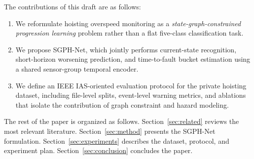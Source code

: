 The contributions of this draft are as follows:
\begin{enumerate}
\item We reformulate hoisting overspeed monitoring as a \emph{state-graph-constrained progression learning} problem rather than a flat five-class classification task.
\item We propose SGPH-Net, which jointly performs current-state recognition, short-horizon worsening prediction, and time-to-fault bucket estimation using a shared sensor-group temporal encoder.
\item We define an IEEE IAS-oriented evaluation protocol for the private hoisting dataset, including file-level splits, event-level warning metrics, and ablations that isolate the contribution of graph constraint and hazard modeling.
\end{enumerate}

The rest of the paper is organized as follows. Section~\ref{sec:related} reviews the most relevant literature. Section~\ref{sec:method} presents the SGPH-Net formulation. Section~\ref{sec:experiments} describes the dataset, protocol, and experiment plan. Section~\ref{sec:conclusion} concludes the paper.
